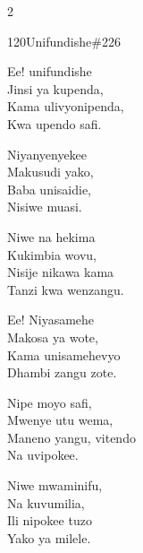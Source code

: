 \documentclass{article}
\begin{document}
\begin{multicols}{2}
\begin{hymn}{120}{Unifundishe}{\#226}
\begin{stanza}
Ee! unifundishe\\
Jinsi ya kupenda,\\
Kama ulivyonipenda,\\
Kwa upendo safi.
\end{stanza}
\begin{stanza}
Niyanyenyekee\\
Makusudi yako,\\
Baba unisaidie,\\
Nisiwe muasi.
\end{stanza}
\begin{stanza}
Niwe na hekima\\
Kukimbia wovu,\\
Nisije nikawa kama\\
Tanzi kwa wenzangu.
\end{stanza}
\begin{stanza}
Ee! Niyasamehe\\
Makosa ya wote,\\
Kama unisamehevyo\\
Dhambi zangu zote.
\end{stanza}
\begin{stanza}
Nipe moyo safi,\\
Mwenye utu wema,\\
Maneno yangu, vitendo\\
Na uvipokee.
\end{stanza}
\begin{stanza}
Niwe mwaminifu,\\
Na kuvumilia,\\
Ili nipokee tuzo\\
Yako ya milele.
\end{stanza}
\end{hymn}


\end{multicols}
\end{document}
